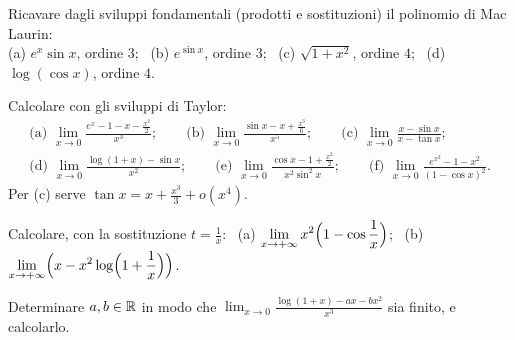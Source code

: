 \begin{esercizio}[\liv{2}]
Ricavare dagli sviluppi fondamentali (prodotti e sostituzioni) il polinomio di Mac Laurin:\\
(a) $e^x\sin x$, ordine $3$; \ (b) $e^{\sin x}$, ordine $3$; \ (c) $\sqrt{1+x^2}$, ordine $4$; \ (d) $\log(\cos x)$, ordine $4$.
\end{esercizio}

\begin{esercizio}[\liv{2}]
Calcolare con gli sviluppi di Taylor:
\begin{gather*}
\text{(a) }\lim_{x\to0}\frac{e^x-1-x-\frac{x^2}2}{x^3};\qquad \text{(b) }\lim_{x\to0}\frac{\sin x-x+\frac{x^3}6}{x^5};\qquad \text{(c) }\lim_{x\to0}\frac{x-\sin x}{x-\tan x};\\
\text{(d) }\lim_{x\to0}\frac{\log(1+x)-\sin x}{x^2};\qquad \text{(e) }\lim_{x\to0}\frac{\cos x-1+\frac{x^2}2}{x^2\sin^2x};\qquad \text{(f) }\lim_{x\to0}\frac{e^{x^2}-1-x^2}{(1-\cos x)^2}.
\end{gather*}
Per (c) serve $\tan x=x+\frac{x^3}3+o(x^4)$.
\end{esercizio}

\begin{esercizio}[\liv{3}]
Calcolare, con la sostituzione $t=\frac1x$: \ (a) $\displaystyle\lim_{x\to+\infty}x^2\Bigl(1-\cos\frac1x\Bigr)$; \ (b) $\displaystyle\lim_{x\to+\infty}\Bigl(x-x^2\log\Bigl(1+\frac1x\Bigr)\Bigr)$.
\end{esercizio}

\begin{esercizio}[\liv{3}]
Determinare $a,b\in\mathbb R$ in modo che $\displaystyle\lim_{x\to0}\frac{\log(1+x)-ax-bx^2}{x^3}$ sia finito, e calcolarlo.
\end{esercizio}

